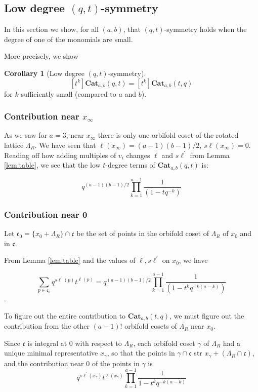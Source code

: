 \documentclass{amsart}[12pt]
\theoremstyle{definition}
\newtheorem{corollary}[dummy]{Corollary}
\newcommand{\Cat}{\mathbf{Cat}}
\newcommand{\sk}{s\ell}
\newcommand{\cone}{\mathfrak{c}}
\begin{document}
\subsection{Low degree \texorpdfstring{$(q,t)$}{(q,t)}-symmetry}
In this section we show, for all $(a,b)$, that $(q,t)$-symmetry holds when the degree of one of the monomials are small.  


More precisely, we show
\begin{corollary}[Low degree $(q,t)$-symmetry]
$$[t^k]\Cat_{a,b}(q,t)=[t^k]\Cat_{a,b}(t,q)$$
for $k$ sufficiently small (compared to $a$ and $b$).
\end{corollary}


\subsubsection{Contribution near $x_\infty$}
As we saw for $a=3$, near $x_\infty$ there is only one orbifold coset of the rotated lattice $\Lambda_R$.  We have seen that $\ell(x_\infty)=(a-1)(b-1)/2$, $\sk(x_\infty)=0$.  Reading off how adding multiples of $v_i$ changes $\ell$ and $\sk^\prime$ from Lemma \ref{lem:table}, we see that the low $t$-degree terms of $\Cat_{a,b}(q,t)$ is:

$$q^{(a-1)(b-1)/2}\prod_{k=1}^{a-1}\frac{1}{(1-tq^{-k})}$$


\subsubsection{Contribution near 0}
Let $\cone_0=\{x_0+\Lambda_R\}\cap\cone$ be the set of points in the orbifold coset of $\Lambda_R$ of $x_0$ and in $\cone$.

From Lemma \ref{lem:table} and the values of $\ell, \sk^\prime$ on $x_0$, we have

$$\sum_{p\in\cone_0} q^{\sk^\prime(p)}t^{\ell(p)}=q^{(a-1)(b-1)/2}\prod_{k=1}^{a-1} \frac{1}{(1-t^kq^{-k(a-k)})}$$.

To figure out the entire contribution to $\Cat_{a,b}(t,q)$, we must figure out the contribution from the other $(a-1)!$ orbifold cosets of $\Lambda_R$ near $x_0$.  

Since $\cone$ is integral at $0$ with respect to $\Lambda_R$, each orbifold coset $\gamma$ of $\Lambda_R$  had a unique minimal representative $x_\gamma$, so that the points in $\gamma\cap\cone$ str $x_\gamma+\left(\Lambda_R\cap \cone\right)$,  and the contribution near $0$ of the points in $\gamma$ is 
$$q^{\sk^\prime(x_\gamma)}t^{\ell(x_\gamma)}\prod_{k=1}^{a-1}\frac{1}{1-t^kq^{-k(a-k)}}$$
\end{document}
